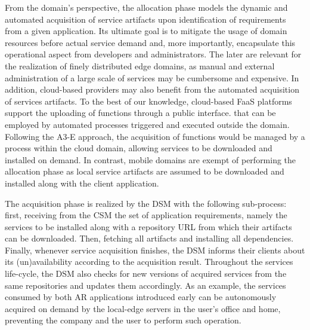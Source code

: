 
From the domain's perspective, the allocation phase models the dynamic and automated acquisition of service artifacts upon identification of requirements from a given application. Its ultimate goal is to mitigate the usage of domain resources before actual service demand and, more importantly, encapsulate this operational aspect from developers and administrators. The later are relevant for the realization of finely distributed edge domains, 
as manual and external administration of a large scale of services may be cumbersome and expensive. In addition, cloud-based providers may also benefit from the automated acquisition of services artifacts. To the best of our knowledge,
cloud-based FaaS platforms support the uploading of functions through a public interface. that can be employed by automated processes triggered and executed outside the domain. Following the A3-E approach, the acquisition of functions would be managed by a process within the cloud domain, allowing services to be downloaded and installed on demand. In contrast, mobile domains are exempt of performing the allocation phase as local service artifacts are assumed to be downloaded and installed along with the client application.


The acquisition phase is realized by the DSM with the following sub-process: first, receiving from the CSM the set of application requirements, namely the services to be installed along with a repository URL from which their artifacts can be downloaded. Then, fetching all artifacts and installing all dependencies. Finally, whenever service acquisition finishes, the DSM informs their clients about its (un)availability according to the acquisition result. Throughout the services life-cycle, the DSM also checks for new versions of acquired services from the same repositories and updates them accordingly. As an example, the services consumed by both AR applications introduced early can be autonomously acquired on demand by the local-edge servers in the user's office and home, preventing the company and the user to perform such operation. 

